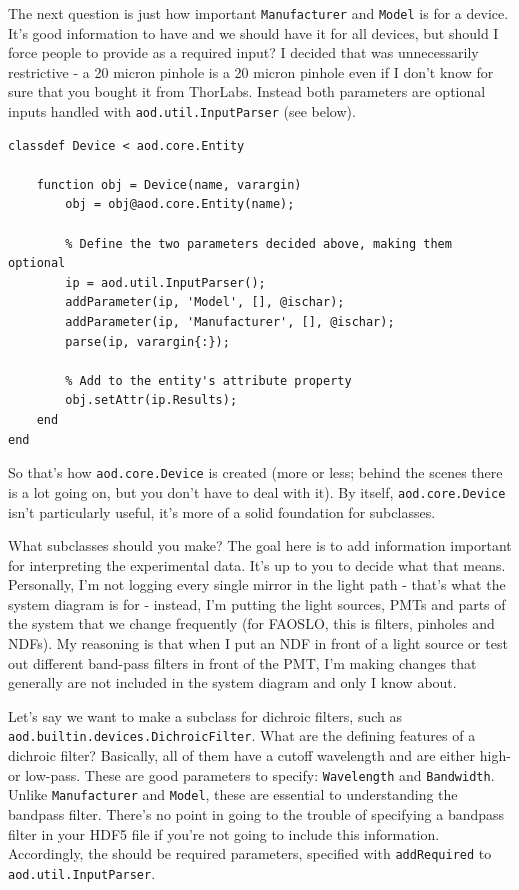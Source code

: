 \documentclass[10pt]{exam}
\newcommand\aodparam[1]{\textcolor{codepurple}{\texttt{#1}}}
\newcommand\aodclass[1]{\textcolor{codeblue}{\texttt{#1}}}
\begin{document}
		The next question is just how important \aodparam{Manufacturer} and \aodparam{Model} is for a device. It's good information to have and we should have it for all devices, but should I force people to provide as a required input? I decided that was unnecessarily restrictive - a 20 micron pinhole is a 20 micron pinhole even if I don't know for sure that you bought it from ThorLabs. Instead both parameters are optional inputs handled with \aodclass{aod.util.InputParser} (see below).
		\begin{lstlisting}[style=matlab-editor, basicstyle=\mlttfamily\footnotesize]
classdef Device < aod.core.Entity
	
	function obj = Device(name, varargin)
		obj = obj@aod.core.Entity(name);
		
		% Define the two parameters decided above, making them optional
		ip = aod.util.InputParser();
		addParameter(ip, 'Model', [], @ischar);
		addParameter(ip, 'Manufacturer', [], @ischar);
		parse(ip, varargin{:});
		
		% Add to the entity's attribute property
		obj.setAttr(ip.Results);
	end
end
		\end{lstlisting}
	\noindent So that's how \aodclass{aod.core.Device} is created (more or less; behind the scenes there is a lot going on, but you don't have to deal with it). 
	By itself, \aodclass{aod.core.Device} isn't particularly useful, it's more of a solid foundation for subclasses. 
	
	What subclasses should you make? The goal here is to add information important for interpreting the experimental data. It's up to you to decide what that means. Personally, I'm not logging every single mirror in the light path - that's what the system diagram is for - instead, I'm putting the light sources, PMTs and parts of the system that we change frequently (for FAOSLO, this is filters, pinholes and NDFs). My reasoning is that when I put an NDF in front of a light source or test out different band-pass filters in front of the PMT, I'm making changes that generally are not included in the system diagram and only I know about. 
	
	Let's say we want to make a subclass for dichroic filters, such as \aodclass{aod.builtin.devices.DichroicFilter}. What are the defining features of a dichroic filter? Basically, all of them have a cutoff wavelength and are either high- or low-pass. These are good parameters to specify: \aodparam{Wavelength} and \aodparam{Bandwidth}. Unlike \aodparam{Manufacturer} and \aodparam{Model}, these are essential to understanding the bandpass filter. There's no point in going to the trouble of specifying a bandpass filter in your HDF5 file if you're not going to include this information. Accordingly, the should be required parameters, specified with \texttt{addRequired} to \aodclass{aod.util.InputParser}.
	
\end{document}
